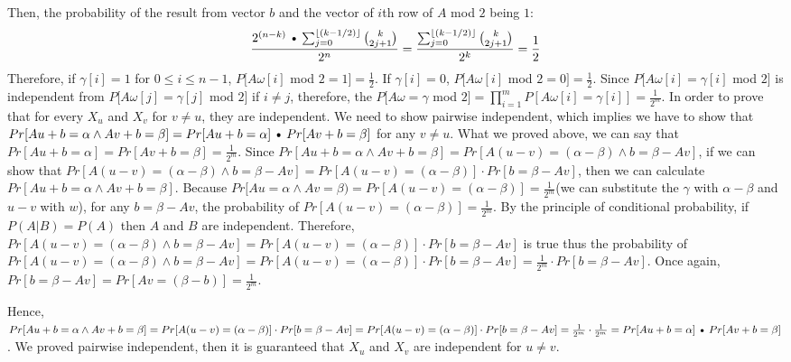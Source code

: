 \documentclass[11pt]{article}
\def\Cdot{\mathbin{\text{\normalfont \textbullet}}}
\begin{document}
\begin{solution}
\begin{enumerate}[(a)]
    Then, the probability of the result from vector $b$ and the vector of $i$th row of $A$ mod $2$ being $1$:
    $$\frac {2^{(n-k)}\Cdot\sum_{j=0}^{\floor{(k-1/2)}}{k\choose 2j+1 }}{2^n} = \frac {\sum_{j=0}^{\floor{(k-1/2)}}{k\choose 2j+1 }}{2^k} = \frac{1}{2}$$
    Therefore, if $\gamma[i] = 1$ for $0\leq i \leq n-1$, $P[A\omega[i]$ mod $2 = 1] = \frac{1}{2}$. If $\gamma[i] = 0$, $P[A\omega[i]$ mod $2 = 0] = \frac{1}{2}$. Since $P[A\omega[i] = \gamma[i]$ mod $2]$ is independent from $P[A\omega[j] = \gamma[j]$ mod $2]$ if $i \neq j$, therefore, the $P[A\omega = \gamma $ mod $2] = \prod_{i=1}^m P[A\omega[i] = \gamma[i]] = \frac{1}{2^m}$. 
    \newline
    \newline
    In order to prove that for every $X_u$ and $X_v$ for $v \neq u$, they are independent. We need to show pairwise independent, which implies we have to show that $Pr[Au+b = \alpha \wedge Av+b = \beta ] = Pr[Au+b = \alpha]\Cdot Pr[ Av+b = \beta ]$ for any $v \neq u$. 
    \newline
    \newline
    What we proved above, we can say that $Pr[Au+b = \alpha] = Pr[ Av+b = \beta ] = \frac{1}{2^m}$. Since $Pr[Au+b = \alpha \wedge Av+b = \beta] = Pr[A(u-v) = (\alpha-\beta) \wedge b = \beta-Av]$, if we can show that $Pr[A(u-v) = (\alpha-\beta) \wedge b = \beta-Av] = Pr[A(u-v) = (\alpha-\beta)] \cdot Pr[b = \beta-Av]$, then we can calculate $Pr[Au+b = \alpha \wedge Av+b = \beta]$.
    \newline
    \newline
    Because $Pr[Au = \alpha \wedge Av = \beta) = Pr[A(u-v) = (\alpha-\beta)] = \frac{1}{2^m}$(we can substitute the $\gamma$ with $\alpha-\beta$ and $u-v$ with $w$), for any $b = \beta-Av$, the probability of $Pr[A(u-v) = (\alpha-\beta)] = \frac{1}{2^m}$. By the principle of conditional probability, if $P(A | B) = P(A)$ then $A$ and $B$ are independent. Therefore, $Pr[A(u-v) = (\alpha-\beta) \wedge b = \beta-Av] = Pr[A(u-v) = (\alpha-\beta)] \cdot Pr[b = \beta-Av]$ is true thus the probability of $Pr[A(u-v) = (\alpha-\beta) \wedge b = \beta-Av] = Pr[A(u-v) = (\alpha-\beta)] \cdot Pr[b = \beta-Av] = \frac{1}{2^m} \cdot Pr[b = \beta-Av]$. Once again, 
    $Pr[b = \beta-Av] = Pr[Av = (\beta-b)] = \frac{1}{2^m}$.
    \newline
    
    Hence, $Pr[Au+b = \alpha \wedge Av+b = \beta] = Pr[A(u-v) = (\alpha-\beta)] \cdot Pr[b = \beta-Av] = Pr[A(u-v) = (\alpha-\beta)] \cdot Pr[b = \beta-Av] = \frac{1}{2^m} \cdot \frac{1}{2^m} = Pr[Au+b = \alpha]\Cdot Pr[ Av+b = \beta ]$. We proved pairwise independent, then it is guaranteed that $X_u$ and $X_v$ are independent for $u \neq v$. 
    

\end{enumerate}
\end{solution}
\end{document}
